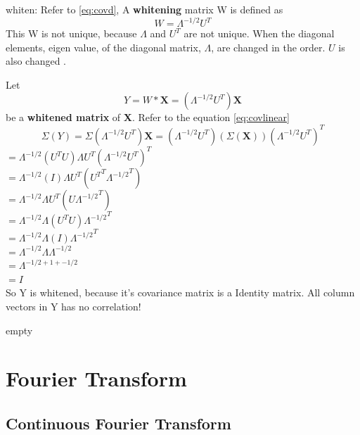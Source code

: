 \documentclass[a4paper,12pt]{article}
\begin{document}
\begin{compactitem}
\item whiten: Refer to \eqref{eq:covd},  A \textbf{whitening} matrix W is defined as
\begin{equation}
\label{eq:whitem}
W=\Lambda^{-1/2} U^{T}
\end{equation}
This W is not unique, because $\Lambda$ and $U^T$ are not unique.
When the diagonal elements, eigen value, of the diagonal matrix, $\Lambda$, are changed in the order. 
$U$ is also changed .

Let
\begin{equation}
\label{eq:whitened}
Y = W*\textbf{X}= (\Lambda^{-1/2} U^{T}) \textbf{X}
\end{equation}
be a \textbf{whitened matrix} of \textbf{X}.
Refer to the equation \eqref{eq:covlinear}
\[
\Sigma (Y)=\Sigma (\Lambda^{-1/2} U^{T}) \textbf{X} = 
(\Lambda^{-1/2} U^{T})(\Sigma (\textbf{X})) (\Lambda^{-1/2} U^{T})^{T}
\]
$=\Lambda^{-1/2} (U^{T}  U) \Lambda U^{T} (\Lambda^{-1/2} U^{T}) ^T$\\
$=\Lambda^{-1/2} (I) \Lambda U^{T} ({U^{T}}^T{\Lambda^{-1/2}}^T)$\\
$=\Lambda^{-1/2} \Lambda U^{T} (U{\Lambda^{-1/2}}^T)$\\
$=\Lambda^{-1/2} \Lambda (U^{T} U) {\Lambda^{-1/2}}^T$\\
$=\Lambda^{-1/2} \Lambda (I) {\Lambda^{-1/2}}^T$\\
$=\Lambda^{-1/2} \Lambda \Lambda^{-1/2}$\\
$=\Lambda^{-1/2 + 1 + -1/2}$\\
$=I$\\
So Y is whitened, because it's covariance matrix is a Identity matrix.
All column vectors in Y has no correlation!

\end{compactitem}

\begin{compactitem}
\item empty
\end{compactitem}


\section{Fourier Transform}

\subsection{Continuous Fourier Transform}
\end{document}
